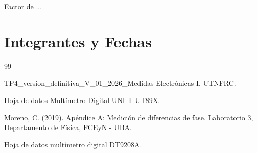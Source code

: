 \documentclass{plantilla}
\begin{document}
\maketitle

\begin{abstract}
En este informe ...
\end{abstract}

\begin{IEEEkeywords}
Factor de ...
\end{IEEEkeywords}

\section{Integrantes y Fechas}

\begin{table}[H]
\end{table}













\begin{thebibliography}{99}

TP4\_version\_definitiva\_V\_01\_2026\_Medidas Electrónicas I, UTNFRC.

Hoja de datos Multímetro Digital UNI-T UT89X.

Moreno, C. (2019). Apéndice A: Medición de diferencias de fase. Laboratorio 3, Departamento de Física, FCEyN - UBA.

Hoja de datos multímetro digital DT9208A.

\end{thebibliography}
\end{document}
